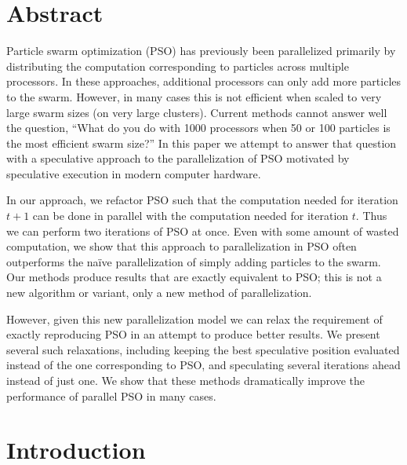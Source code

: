 \documentclass[ms]{byuprop}
\title{\Title}
\author{\Author}
\begin{document}
\maketitle



\section{Abstract}

Particle swarm optimization (PSO) has previously been parallelized primarily by
distributing the computation corresponding to particles across multiple
processors.  In these approaches, additional processors can only add more
particles to the swarm.  However, in many cases this is not efficient when
scaled to very large swarm sizes (on very large clusters).  Current methods
cannot answer well the question, ``What do you do with 1000 processors when 50
or 100 particles is the most efficient swarm size?''  In this paper we attempt
to answer that question with a speculative approach to the parallelization of
PSO motivated by speculative execution in modern computer hardware.

In our approach, we refactor PSO such that the computation needed for iteration
$t+1$ can be done in parallel with the computation needed for iteration $t$.
Thus we can perform two iterations of PSO at once.  Even with some amount of
wasted computation, we show that this approach to parallelization in PSO often
outperforms the na\"ive parallelization of simply adding particles to the
swarm.  Our methods produce results that are exactly equivalent to PSO; this is
not a new algorithm or variant, only a new method of parallelization.

However, given this new parallelization model we can relax the requirement of
exactly reproducing PSO in an attempt to produce better results.  We present
several such relaxations, including keeping the best speculative position
evaluated instead of the one corresponding to PSO, and speculating several
iterations ahead instead of just one.  We show that these methods dramatically
improve the performance of parallel PSO in many cases.


\section{Introduction}
\label{sec:intro}
\end{document}
